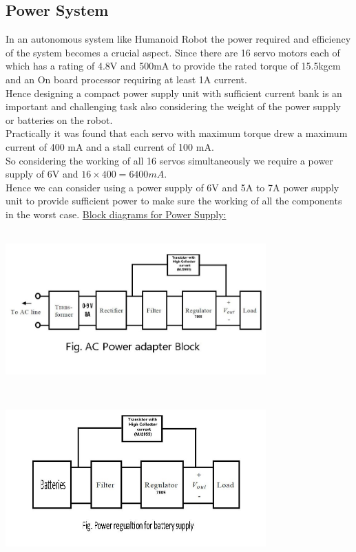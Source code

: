 \documentclass[12pt]{article}
\begin{document}
\subsection{Power System}
In an autonomous system like Humanoid Robot the power required and efficiency of the
system becomes a crucial aspect. Since there are 16 servo motors each of which has a
rating of 4.8V and 500mA to provide the rated torque of 15.5kgcm and an On board
processor requiring at least 1A current.\\
Hence designing a compact power supply unit with sufficient current bank is an important
and challenging task also considering the weight of the power supply or batteries on the
robot.\\
Practically it was found that each servo with maximum torque drew a maximum current of
400 mA and a stall current of 100 mA.\\
So considering the working of all 16 servos simultaneously we require a power supply of
6V and $16 \times 400 = 6400 mA$.\\
Hence we can consider using a power supply of 6V and 5A to 7A power supply unit to
provide sufficient power to make sure the working of all the components in the worst case.
\underline{Block diagrams for Power Supply:}
\begin{center}
	\includegraphics[width = 10cm,height= 6cm]{ac.jpg}
	\newline
	
\end{center}
 \begin{center}
 	\includegraphics[width = 10cm,height= 6cm]{dc.jpg}
 \end{center}
\end{document}

